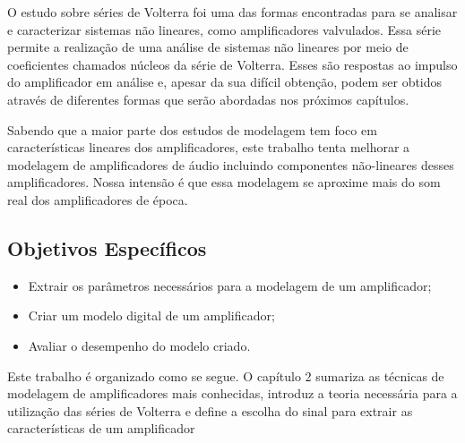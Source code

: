 O estudo sobre séries de Volterra foi uma das formas encontradas para se analisar e caracterizar sistemas não lineares, como amplificadores valvulados. Essa série permite a realização de uma análise de sistemas não lineares por meio de coeficientes chamados núcleos da série de Volterra. Esses  são respostas ao impulso do amplificador em análise e, apesar da sua difícil obtenção, podem ser obtidos através de diferentes formas que serão abordadas nos próximos capítulos.

Sabendo que a maior parte dos estudos de modelagem tem foco em 
características lineares dos amplificadores, este trabalho tenta melhorar a modelagem de amplificadores de áudio incluindo 
componentes não-lineares desses amplificadores. Nossa intensão é que essa modelagem se aproxime mais do som real 
dos amplificadores de época.

\subsection*{Objetivos Específicos}
\begin{itemize}
	\item Extrair os parâmetros necessários para a modelagem de um amplificador;
	\item Criar um modelo digital de um amplificador;
	\item Avaliar o desempenho do modelo criado.
\end{itemize}

Este trabalho é organizado como se segue. O capítulo 2 sumariza as técnicas de modelagem de amplificadores mais conhecidas, introduz a teoria necessária para a utilização das séries de Volterra e define a escolha do sinal para extrair as características de um amplificador